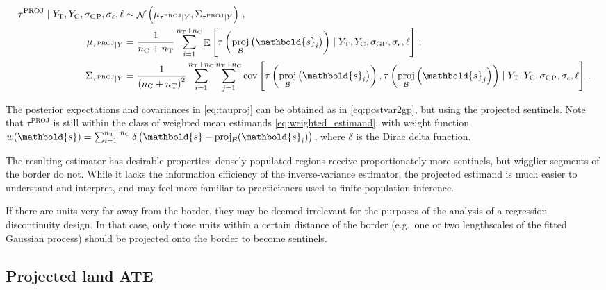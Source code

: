 \documentclass[letter]{article}
\DeclareMathOperator{\E}{\mathbb{E}}
\DeclareMathOperator{\cov}{{cov}}
\DeclareMathOperator{\normal}{\mathcal{N}}
\newcommand{\treat}{\mathrm{T}}
\newcommand{\ctrol}{\mathrm{C}}
\newcommand{\sigmaf}{\sigma_{\mathrm{GP}}}
\newcommand{\sigman}{\sigma_{\epsilon}}
\newcommand{\svec}{\mathbold{s}}
\newcommand{\boundary}{\mathcal{B}}
\newcommand{\tauproj}{\tau^{\mathrm{PROJ}}}
\newcommand{\eqlabel}[1]{\label{#1}}
\DeclareMathOperator{\proj}{proj}
\begin{document}
\begin{equation}\begin{split}
    \tauproj \mid Y_\treat{}, Y_\ctrol{}, \sigmaf, \sigman, \ell &\sim \normal\del{\mu_{\tauproj \mid Y}, \Sigma_{\tauproj \mid Y}}\,, \\
    \mu_{\tauproj \mid Y} &= \frac{1}{n_\ctrol{} + n_\treat{}} \sum_{i=1}^{n_\treat{}+n_\ctrol{}} 
        \E\sbr{
            \tau\del{
                \proj_{\boundary}\del{\svec_i}
            }
            \mid Y_\treat{}, Y_\ctrol{}, \sigmaf, \sigman, \ell
         } \,,\\
    \Sigma_{\tauproj \mid Y} &= \frac{1}{\del{n_\ctrol{} + n_\treat{}}^2}
        \sum_{i=1}^{n_\treat{}+n_\ctrol{}} 
        \sum_{j=1}^{n_\treat{}+n_\ctrol{}} 
        \cov\sbr{
            \tau\del{
                \proj_{\boundary}\del{\svec_i}
            },
            \tau\del{
                \proj_{\boundary}\del{\svec_j}
            }
            \mid Y_\treat{}, Y_\ctrol{}, \sigmaf, \sigman, \ell
        }\,.
\end{split}
\eqlabel{eq:tauproj}
\end{equation}

The posterior expectations and covariances in \eqref{eq:tauproj} can be obtained as in \eqref{eq:postvar2gp}, but using the projected sentinels.
Note that \(\tauproj\) is still within the class of weighted mean estimands \eqref{eq:weighted_estimand},
with weight function \(w(\svec) = \sum_{i=1}^{n_\treat{}+n_\ctrol{}} \delta\del{ \svec - \proj_\boundary(\svec_i)}\), where \(\delta\) is the Dirac delta function.

The resulting estimator has desirable properties: densely populated regions receive proportionately more sentinels, but wigglier segments of the border do not.
While it lacks the information efficiency of the inverse-variance estimator,
the projected estimand is much easier to understand and interpret,
and may feel more familiar to practicioners used to finite-population inference.

If there are units very far away from the border,
they may be deemed irrelevant for the purposes of the analysis of a regression discontinuity design. In that case, only those units within a certain distance of the border (e.g.~one or two lengthscales of the fitted Gaussian process) should be projected onto the border to become sentinels.
    


    	\subsection{Projected land ATE}\label{projected-land-ate}
\end{document}
